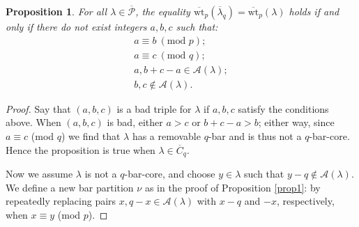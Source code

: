 \documentclass[10pt]{amsart}
\newtheorem{prop}{Proposition}[section]
\begin{document}
\begin{prop}\label{prop2}
For all $\lambda\in\overline{\mathcal{P}}$, the equality $\overline{\text{wt}}_p(\overline{\lambda}_q)=\overline{\text{wt}}_p(\lambda)$ holds if and only if there do not exist integers $a,b,c$ such that: 
\begin{align*}a\equiv b\:(\text{mod }p);\\
a\equiv c\:(\text{mod }q);\\
a,b+c-a\in\mathcal{A}(\lambda);\\
b,c\not\in\mathcal{A}(\lambda).\end{align*}
\end{prop}
\begin{proof}
Say that $(a,b,c)$ is a bad triple for $\lambda$ if $a,b,c$ satisfy the conditions above. When $(a,b,c)$ is bad, either $a>c$ or $b+c-a>b$; either way, since $a\equiv c$ (mod $q$) we find that $\lambda$ has a removable $q$-bar and is thus not a $q$-bar-core. Hence the proposition is true when $\lambda\in\overline{C}_q$. 

Now we assume $\lambda$ is not a $q$-bar-core, and choose $y\in\lambda$ such that $y-q\not\in\mathcal{A}(\lambda)$. We define a new bar partition $\nu$ as in the proof of Proposition \ref{prop1}: by repeatedly replacing pairs $x,q-x\in\mathcal{A}(\lambda)$ with $x-q$ and $-x$, respectively, when $x\equiv y$ (mod $p$). 


\end{proof}
\end{document}
